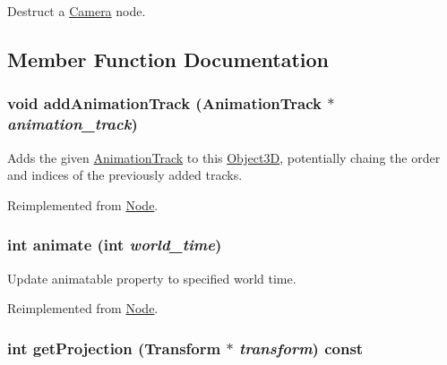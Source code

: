 Destruct a \hyperlink{classm3g_1_1Camera}{Camera} node. 

\subsection{Member Function Documentation}
\hypertarget{classm3g_1_1Camera_415c0b110f95410ded9b85e5d99a496b}{
\subsubsection[{addAnimationTrack}]{\setlength{\rightskip}{0pt plus 5cm}void addAnimationTrack ({\bf AnimationTrack} $\ast$ {\em animation\_\-track})}}
\label{classm3g_1_1Camera_415c0b110f95410ded9b85e5d99a496b}


Adds the given \hyperlink{classm3g_1_1AnimationTrack}{AnimationTrack} to this \hyperlink{classm3g_1_1Object3D}{Object3D}, potentially chaing the order and indices of the previously added tracks. 

Reimplemented from \hyperlink{classm3g_1_1Node_415c0b110f95410ded9b85e5d99a496b}{Node}.\hypertarget{classm3g_1_1Camera_8aad1ceab4c2a03609c8a42324ce484d}{
\subsubsection[{animate}]{\setlength{\rightskip}{0pt plus 5cm}int animate (int {\em world\_\-time})}}
\label{classm3g_1_1Camera_8aad1ceab4c2a03609c8a42324ce484d}


Update animatable property to specified world time. 

Reimplemented from \hyperlink{classm3g_1_1Node_8aad1ceab4c2a03609c8a42324ce484d}{Node}.\hypertarget{classm3g_1_1Camera_9e0c204df146342990703acb744954b1}{
\subsubsection[{getProjection}]{\setlength{\rightskip}{0pt plus 5cm}int getProjection ({\bf Transform} $\ast$ {\em transform}) const}}
\label{classm3g_1_1Camera_9e0c204df146342990703acb744954b1}


